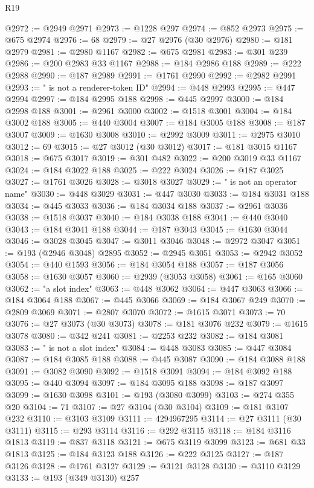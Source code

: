 \begin{lexlean}{R19}
\begin{coremodule}
@2972 := @2949 @2971
@2973 := @1228 @297
@2974 := @852 @2973
@2975 := @675 @2974
@2976 := 68
@2979 := @27 @2976 (@30 @2976)
@2980 := @181 @2979
@2981 := @2980 @1167
@2982 := @675 @2981
@2983 := @301 @239
@2986 := @200 @2983 @33 @1167
@2988 := @184 @2986 @188
@2989 := @222 @2988
@2990 := @187 @2989
@2991 := @1761 @2990
@2992 := @2982 @2991
@2993 := " is not a renderer-token ID"
@2994 := @448 @2993
@2995 := @447 @2994
@2997 := @184 @2995 @188
@2998 := @445 @2997
@3000 := @184 @2998 @188
@3001 := @2961 @3000
@3002 := @1518 @3001
@3004 := @184 @3002 @188
@3005 := @440 @3004
@3007 := @184 @3005 @188
@3008 := @187 @3007
@3009 := @1630 @3008
@3010 := @2992 @3009
@3011 := @2975 @3010
@3012 := 69
@3015 := @27 @3012 (@30 @3012)
@3017 := @181 @3015 @1167
@3018 := @675 @3017
@3019 := @301 @482
@3022 := @200 @3019 @33 @1167
@3024 := @184 @3022 @188
@3025 := @222 @3024
@3026 := @187 @3025
@3027 := @1761 @3026
@3028 := @3018 @3027
@3029 := " is not an operator name"
@3030 := @448 @3029
@3031 := @447 @3030
@3033 := @184 @3031 @188
@3034 := @445 @3033
@3036 := @184 @3034 @188
@3037 := @2961 @3036
@3038 := @1518 @3037
@3040 := @184 @3038 @188
@3041 := @440 @3040
@3043 := @184 @3041 @188
@3044 := @187 @3043
@3045 := @1630 @3044
@3046 := @3028 @3045
@3047 := @3011 @3046
@3048 := @2972 @3047
@3051 := @193 (@2946 @3048) @2895
@3052 := @2945 @3051
@3053 := @2942 @3052
@3054 := @440 @1593
@3056 := @184 @3054 @188
@3057 := @187 @3056
@3058 := @1630 @3057
@3060 := @2939 (@3053 @3058)
@3061 := @165 @3060
@3062 := "a slot index"
@3063 := @448 @3062
@3064 := @447 @3063
@3066 := @184 @3064 @188
@3067 := @445 @3066
@3069 := @184 @3067 @249
@3070 := @2809 @3069
@3071 := @2807 @3070
@3072 := @1615 @3071
@3073 := 70
@3076 := @27 @3073 (@30 @3073)
@3078 := @181 @3076 @232
@3079 := @1615 @3078
@3080 := @342 @241
@3081 := @2253 @232
@3082 := @184 @3081
@3083 := " is not a slot index"
@3084 := @448 @3083
@3085 := @447 @3084
@3087 := @184 @3085 @188
@3088 := @445 @3087
@3090 := @184 @3088 @188
@3091 := @3082 @3090
@3092 := @1518 @3091
@3094 := @184 @3092 @188
@3095 := @440 @3094
@3097 := @184 @3095 @188
@3098 := @187 @3097
@3099 := @1630 @3098
@3101 := @193 (@3080 @3099)
@3103 := @274 @355 @20
@3104 := 71
@3107 := @27 @3104 (@30 @3104)
@3109 := @181 @3107 @232
@3110 := @3103 @3109
@3111 := 4294967295
@3114 := @27 @3111 (@30 @3111)
@3115 := @293 @3114
@3116 := @292 @3115
@3118 := @184 @3116 @1813
@3119 := @837 @3118
@3121 := @675 @3119 @3099
@3123 := @681 @33 @1813
@3125 := @184 @3123 @188
@3126 := @222 @3125
@3127 := @187 @3126
@3128 := @1761 @3127
@3129 := @3121 @3128
@3130 := @3110 @3129
@3133 := @193 (@349 @3130) @257

\end{coremodule}
\end{lexlean}
